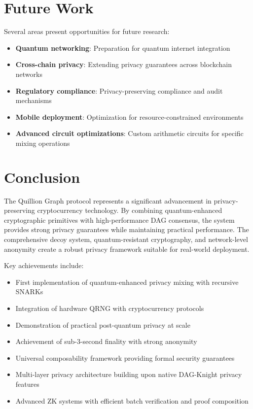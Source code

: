 \documentclass[12pt,a4paper]{article}
\begin{document}
\section{Future Work}

Several areas present opportunities for future research:

\begin{itemize}
\item \textbf{Quantum networking}: Preparation for quantum internet integration
\item \textbf{Cross-chain privacy}: Extending privacy guarantees across blockchain networks  
\item \textbf{Regulatory compliance}: Privacy-preserving compliance and audit mechanisms
\item \textbf{Mobile deployment}: Optimization for resource-constrained environments
\item \textbf{Advanced circuit optimizations}: Custom arithmetic circuits for specific mixing operations
\end{itemize}

\section{Conclusion}

The Quillion Graph protocol represents a significant advancement in privacy-preserving cryptocurrency technology. By combining quantum-enhanced cryptographic primitives with high-performance DAG consensus, the system provides strong privacy guarantees while maintaining practical performance. The comprehensive decoy system, quantum-resistant cryptography, and network-level anonymity create a robust privacy framework suitable for real-world deployment.

Key achievements include:
\begin{itemize}
\item First implementation of quantum-enhanced privacy mixing with recursive SNARKs
\item Integration of hardware QRNG with cryptocurrency protocols
\item Demonstration of practical post-quantum privacy at scale
\item Achievement of sub-3-second finality with strong anonymity
\item Universal composability framework providing formal security guarantees
\item Multi-layer privacy architecture building upon native DAG-Knight privacy features
\item Advanced ZK systems with efficient batch verification and proof composition
\end{itemize}
\end{document}
